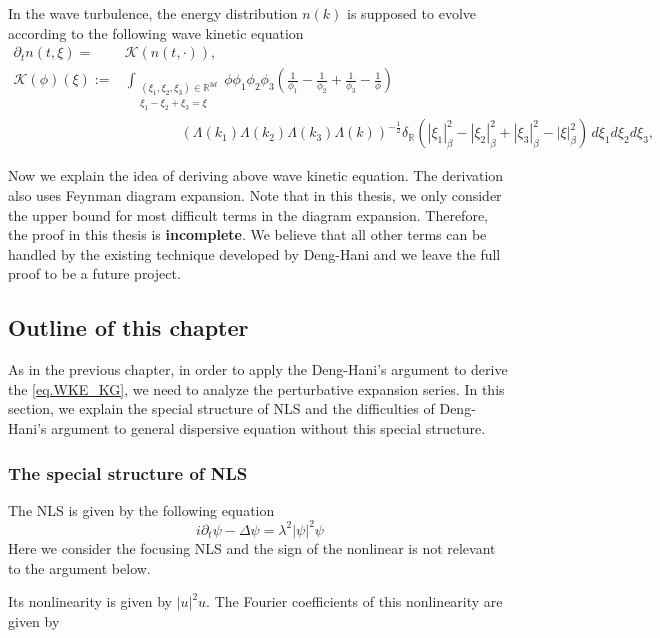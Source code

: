 In the wave turbulence, the energy distribution $n(k)$ is supposed to evolve according to the following wave kinetic equation
\[
\tag{WKE}\label{eq.WKE_KG}
\begin{split}
\partial_t n(t, \xi) =&\mathcal K\left(n(t, \cdot)\right), \\
\mathcal K(\phi)(\xi):=& \int_{\substack{(\xi_1, \xi_2, \xi_3)\in \mathbb{R}^{3d}\\\xi_1-\xi_2+\xi_3=\xi}} \phi \phi_1 \phi_2 \phi_3\left(\frac{1}{\phi_1}-\frac{1}{\phi_2}+\frac{1}{\phi_3}-\frac{1}{\phi}\right)
\\
&\qquad\qquad(\Lambda(k_1)\Lambda(k_2)\Lambda(k_3)\Lambda(k))^{-\frac{1}{2}}\delta_{\mathbb{R}}(|\xi_1|_\beta^2-|\xi_2|_\beta^2+|\xi_3|_\beta^2-|\xi|_\beta^2)\, d\xi_1 d\xi_2 d\xi_3,
\end{split}
\]


Now we explain the idea of deriving above wave kinetic equation. The derivation also uses Feynman diagram expansion. Note that in this thesis, we only consider the upper bound for most difficult terms in the diagram expansion. Therefore, the proof in this thesis is \textbf{incomplete}. We believe that all other terms can be handled by the existing technique developed by Deng-Hani \cite{} and we leave the full proof to be a future project.





\subsection{Outline of this chapter} As in the previous chapter, in order to apply the Deng-Hani's argument to derive the \eqref{eq.WKE_KG}, we need to analyze the perturbative expansion series. In this section, we explain the special structure of NLS and the difficulties of Deng-Hani's argument to general dispersive equation without this special structure. 

\subsubsection{The special structure of NLS}\label{sec.specialintro} The NLS is given by the following equation
\begin{equation}
    i\partial_t\psi-\Delta\psi=\lambda^2 |\psi|^2\psi
\end{equation}
Here we consider the focusing NLS and the sign of the nonlinear is not relevant to the argument below.

Its nonlinearity is given by $|u|^2u$. The Fourier coefficients of this nonlinearity are given by


